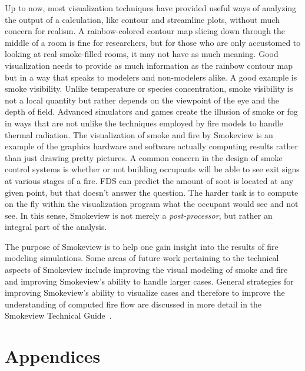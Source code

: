 \documentclass[11pt,twoside]{book}
\begin{document}
Up to now, most visualization techniques have provided useful ways
of analyzing the output of a calculation, like contour and
streamline plots, without much concern for realism. A
rainbow-colored contour map slicing down through the middle of a
room is fine for researchers, but for those who are only
accustomed to looking at real smoke-filled rooms, it may not have
as much meaning. Good visualization needs to provide as much
information as the rainbow contour map but in a way that speaks to
modelers and non-modelers alike. A good example is smoke
visibility. Unlike temperature or species concentration, smoke
visibility is not a local quantity but rather depends on the
viewpoint of the eye and the depth of field. Advanced simulators
and games create the illusion of smoke or fog in ways that are not
unlike the techniques employed by fire models to handle thermal
radiation. The visualization of smoke and fire by Smokeview is an
example of the graphics hardware and software actually computing
results rather than just drawing pretty pictures. A common concern
in the design of smoke control systems is whether or not building
occupants will be able to see exit signs at various stages of a
fire. FDS can predict the amount of soot is located at any given
point, but that doesn't answer the question. The harder task is to
compute on the fly within the visualization program what the
occupant would see and not see. In this sense, Smokeview is not
merely a {\em post-processor}, but rather an integral part of the
analysis.

The purpose of Smokeview is to help one gain insight into the results
of fire modeling simulations.
Some areas of future work pertaining to the technical aspects of
Smokeview include improving the visual modeling of smoke and fire
and improving Smokeview's ability to handle larger cases.
General strategies for improving Smokeview's ability to visualize
cases and therefore to improve the understanding of computed fire
flow are discussed in more detail in the
Smokeview Technical Guide~\cite{Smokeview_Tech_Guide}.






\part{Appendices}
\appendix
{}
\end{document}
